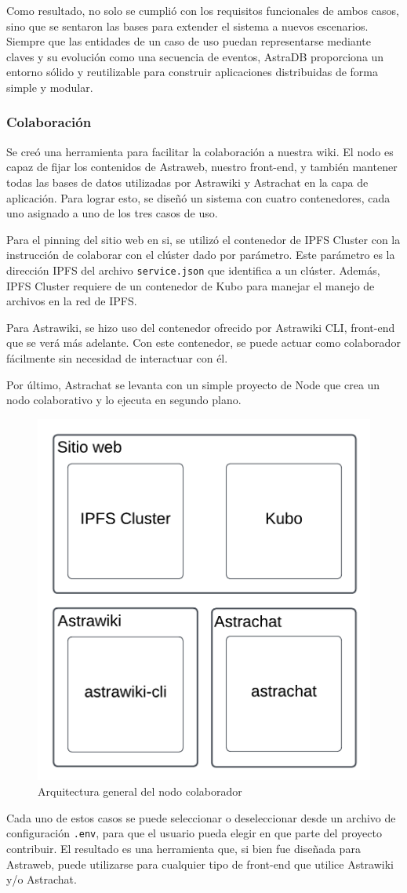 Como resultado, no solo se cumplió con los requisitos funcionales de ambos casos, sino que se sentaron las bases para extender el sistema a nuevos escenarios. Siempre que las entidades de un caso de uso puedan representarse mediante claves y su evolución como una secuencia de eventos, AstraDB proporciona un entorno sólido y reutilizable para construir aplicaciones distribuidas de forma simple y modular.


\subsubsection{Colaboración}

Se creó una herramienta para facilitar la colaboración a nuestra wiki. El nodo es capaz de fijar los contenidos de Astraweb, nuestro front-end, y también mantener todas las bases de datos utilizadas por Astrawiki y Astrachat en la capa de aplicación. Para lograr esto, se diseñó un sistema con cuatro contenedores, cada uno asignado a uno de los tres casos de uso.

Para el pinning del sitio web en si, se utilizó el contenedor de IPFS Cluster con la instrucción de colaborar con el clúster dado por parámetro. Este parámetro es la dirección IPFS del archivo \texttt{service.json} que identifica a un clúster. Además, IPFS Cluster requiere de un contenedor de Kubo para manejar el manejo de archivos en la red de IPFS.

Para Astrawiki, se hizo uso del contenedor ofrecido por Astrawiki CLI, front-end que se verá más adelante. Con este contenedor, se puede actuar como colaborador fácilmente sin necesidad de interactuar con él.

Por último, Astrachat se levanta con un simple proyecto de Node que crea un nodo colaborativo y lo ejecuta en segundo plano.

\begin{figure}[H]
    \centering
    \includegraphics[width=0.5\linewidth]{img/solucion-ipfs/collaborator-arch.png}
    \caption{Arquitectura general del nodo colaborador}
    \label{fig:collaborator-architecture}
\end{figure}

Cada uno de estos casos se puede seleccionar o deseleccionar desde un archivo de configuración \texttt{.env}, para que el usuario pueda elegir en que parte del proyecto contribuir. El resultado es una herramienta que, si bien fue diseñada para Astraweb, puede utilizarse para cualquier tipo de front-end que utilice Astrawiki y/o Astrachat.